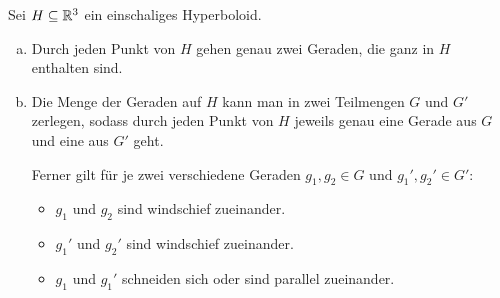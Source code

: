 \documentclass[
 a4paper,
 12pt,
 parskip=half
 ]{scrartcl}
\theoremstyle{plain}
\theoremstyle{definition}
\begin{document}
\begin{thm}
  Sei $H \subseteq \mathbb{R}^3$ ein einschaliges Hyperboloid.
  \begin{enumerate}[a)]
  \item Durch jeden Punkt von $H$ gehen genau zwei Geraden, die ganz in $H$
    enthalten sind.
  \item Die Menge der Geraden auf $H$ kann man in zwei Teilmengen $G$ und $G'$
    zerlegen, sodass durch jeden Punkt von $H$ jeweils genau eine Gerade aus $G$
    und eine aus $G'$ geht.

    Ferner gilt für je zwei verschiedene Geraden $g_1,g_2 \in G$ und $g_1',g_2'
    \in G'$:
    \begin{itemize}
    \item $g_1$ und $g_2$ sind windschief zueinander.
    \item $g_1'$ und $g_2'$ sind windschief zueinander.
    \item $g_1$ und $g_1'$ schneiden sich oder sind parallel zueinander.
    \end{itemize}
  \end{enumerate}
\end{thm}
\end{document}
